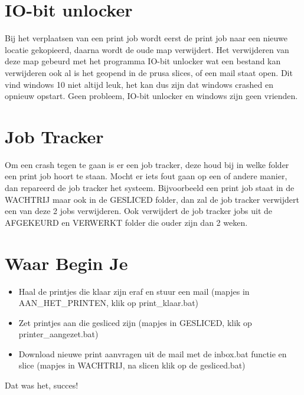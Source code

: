 \documentclass{article}
\begin{document}
\section*{IO-bit unlocker}
Bij het verplaatsen van een print job wordt eerst de print job naar een nieuwe locatie gekopieerd, daarna wordt de oude map verwijdert. Het verwijderen van deze map gebeurd met het programma IO-bit unlocker wat een bestand kan verwijderen ook al is het geopend in de prusa slices, of een mail staat open. Dit vind windows 10 niet altijd leuk, het kan dus zijn dat windows crashed en opnieuw opstart. Geen probleem, IO-bit unlocker en windows zijn geen vrienden.

\section*{Job Tracker}
Om een crash tegen te gaan is er een job tracker, deze houd bij in welke folder een print job hoort te staan. Mocht er iets fout gaan op een of andere manier, dan repareerd de job tracker het systeem. Bijvoorbeeld een print job staat in de WACHTRIJ maar ook in de GESLICED folder, dan zal de job tracker verwijdert een van deze 2 jobs verwijderen. Ook verwijdert de job tracker jobs uit de AFGEKEURD en VERWERKT folder die ouder zijn dan 2 weken.\\

\section*{Waar Begin Je}
\begin{itemize}
  \item Haal de printjes die klaar zijn eraf en stuur een mail (mapjes in AAN\_HET\_PRINTEN, klik op print\_klaar.bat)
\item Zet printjes aan die gesliced zijn (mapjes in GESLICED, klik op printer\_aangezet.bat)
\item Download nieuwe print aanvragen uit de mail met de inbox.bat functie en slice (mapjes in WACHTRIJ, na slicen klik op de gesliced.bat)
\end{itemize}

\noindent Dat was het, succes!
\end{document}
